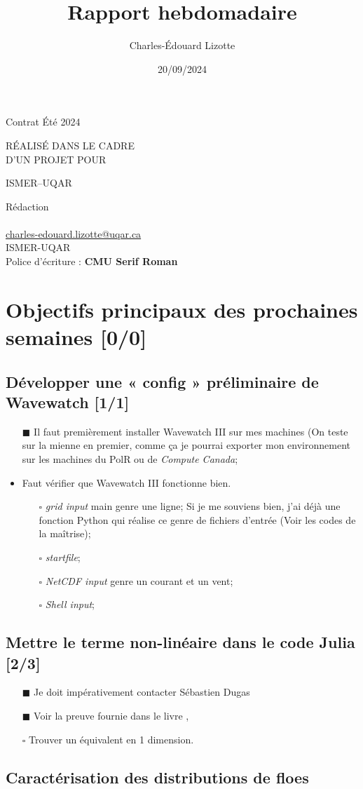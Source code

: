 \documentclass[10pt]{article}
\author{Charles-Édouard Lizotte}
\date{20/09/2024}
\title{Rapport hebdomadaire}
\makeatletter
\numberwithin{equation}{section}
\renewcommand{\boxtimes}{\blacksquare}
\newcommand{\mytitlepage}{
\begin{titlepage}
\begin{center}
{\Huge \thesubtitle \par}
\vspace{2cm}
{\Huge \MakeUppercase{\thetitle} \par}
\vspace{2cm}
RÉALISÉ DANS LE CADRE\\ D'UN PROJET POUR \par
\vspace{2cm}
{\Huge ISMER--UQAR \par}
\vspace{2cm}
{\thedate}
\end{center}
\vfill
Rédaction \\
{\theauthor}\\
\url{charles-edouard.lizotte@uqar.ca}\\
ISMER-UQAR\\
Police d'écriture : \textbf{CMU Serif Roman}
\end{titlepage}
}
\newcommand{\thesubtitle}{Contrat Été 2024}
\makeatother
\begin{document}
\mytitlepage
\tableofcontents\newpage
\section{Objectifs principaux des prochaines semaines [0/0]}
\label{sec:org5e827ef}

\subsection{Développer une « config » préliminaire de Wavewatch [1/1]}
\label{sec:org84be140}

\begin{itemize}
\item[{$\boxtimes$}] Il faut premièrement installer Wavewatch III sur mes machines (On teste sur la mienne en premier, comme ça je pourrai exporter mon environnement sur les machines du PolR ou de \emph{Compute Canada};
\item\relax [0/4] Faut vérifier que Wavewatch III fonctionne bien.
\begin{itemize}
\item[{$\square$}] \emph{grid input} main genre une ligne; Si je me souviens bien, j'ai déjà une fonction Python qui réalise ce genre de fichiers d'entrée (Voir les codes de la maîtrise);
\item[{$\square$}] \emph{startfile};
\item[{$\square$}] \emph{NetCDF input} genre un courant et un vent;
\item[{$\square$}] \emph{Shell input};
\end{itemize}
\end{itemize}
\subsection{Mettre le terme non-linéaire dans le code Julia  [2/3]}
\label{sec:org0392e1c}

\begin{itemize}
\item[{$\boxtimes$}] Je doit impérativement contacter Sébastien Dugas
\item[{$\boxtimes$}] Voir la preuve fournie dans le livre \autocite{kinsman1965their},
\item[{$\square$}] Trouver un équivalent en 1 dimension.
\end{itemize}
\subsection{Caractérisation des distributions de floes}
\label{sec:orgce40586}
\end{document}
